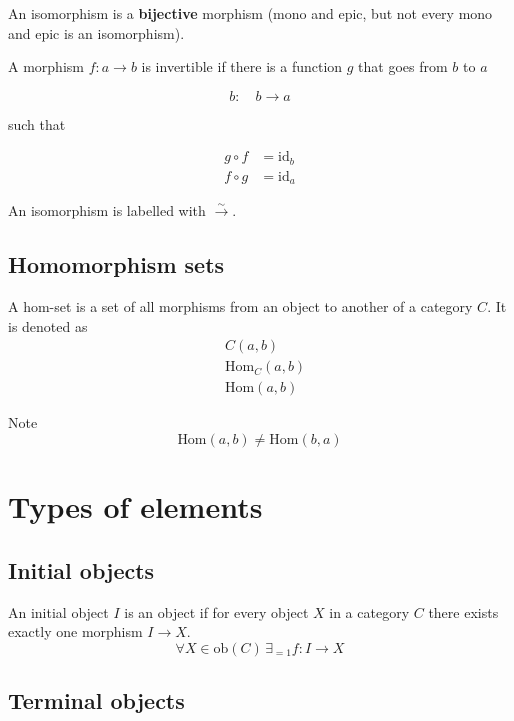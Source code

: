 \documentclass[a4paper]{article}
\begin{document}
An isomorphism is a \textbf{bijective} morphism (mono and epic, but not every mono and epic
is an isomorphism).

A morphism \(f: a \rightarrow b\) is invertible if there
is a function \(g\) that goes from \(b\) to \(a\)

\[
    b:\quad b \rightarrow a
\]

such that

\begin{align*}
    g \circ f &= \text{id}_b
    \\
    f \circ g &= \text{id}_a
\end{align*}

\begin{center}
\end{center}

An isomorphism is labelled with \(\xrightarrow{\sim}\).

\pagebreak

\subsection{Homomorphism sets} %

A hom-set is a set of all morphisms from an object to another
of a category \(C\).
It is denoted as
\begin{align*}
    &C(a, b) \\
    &\text{Hom}_C(a, b) \\
    &\text{Hom}(a, b)
\end{align*}

Note
\[
    \text{Hom}(a, b) \neq \text{Hom}(b, a)
\]

\section{Types of elements}

\subsection{Initial objects}

An initial object \(I\) is an object if
for every object \(X\) in a category \(C\)
there exists exactly one morphism \(I\to X\).
\[
    \forall X\in \text{ob}(C) \,\exists_{=1}f:I\to X
\]

\subsection{Terminal objects}
\end{document}
